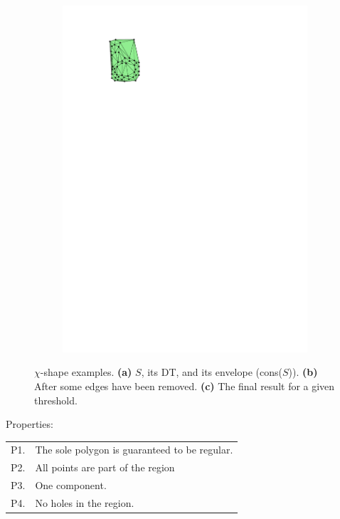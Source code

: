 \begin{figure}
\begin{subfigure}[b]{0.25\linewidth}
    \includegraphics[page=3,width=\textwidth]{figs/chishape.pdf}
    \caption{}
  \end{subfigure}
\caption{$\chi$-shape examples. \textbf{(a)} $S$, its DT, and its envelope (cons($S$)). \textbf{(b)} After some edges have been removed. \textbf{(c)} The final result for a given threshold.}
\label{fig:chishape}
\end{figure}

%

Properties:
\\
\begin{tabular}{@{}ll@{}}
\toprule
P1. & The sole polygon is guaranteed to be regular.  \\  
P2. & All points are part of the region \\ 
P3. & One component.  \\ 
P4. & No holes in the region.  \\  
\bottomrule
\end{tabular}


